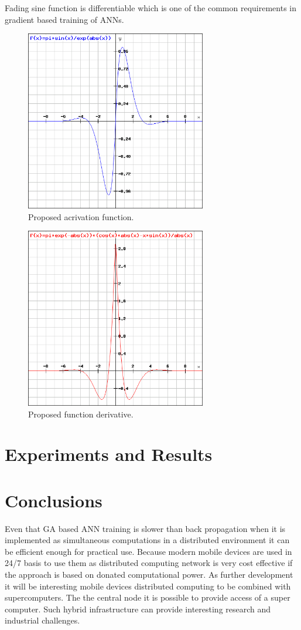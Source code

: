 \documentclass{llncs}
\begin{document}
Fading sine function is differentiable which is one of the common requirements in gradient based training of ANNs.
%
\begin{figure}
	\centering
	\includegraphics[width=7.88cm,height=7.88cm]{fig03.png}
	\caption{Proposed acrivation function.}
	\label{fig:Graph}
\end{figure}
%
\begin{figure}
	\centering
	\includegraphics[width=7.88cm,height=7.88cm]{fig04.png}
	\caption{Proposed function derivative.}
	\label{fig:Graph}
\end{figure}
\FloatBarrier
%
\section{Experiments and Results}
%
%
\section{Conclusions}
%
Even that GA based ANN training is slower than back propagation when it is implemented as simultaneous computations in a distributed environment it can be efficient enough for practical use. Because modern mobile devices are used in 24/7 basis to use them as distributed computing network is very cost effective if the approach is based on donated computational power. As further development it will be interesting mobile devices distributed computing to be combined with supercomputers. The the central node it is possible to provide access of a super computer. Such hybrid infrastructure can provide interesting research and industrial challenges.
%
\end{document}

